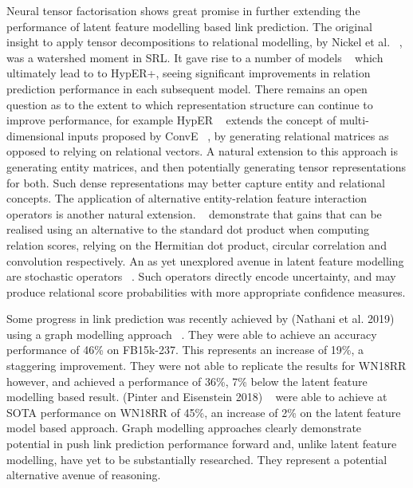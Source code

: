 \noindent Neural tensor factorisation shows great promise in further extending the performance of latent feature modelling based link prediction. The original insight to apply tensor decompositions to relational modelling, by Nickel et al. \unskip~\citep{nickel2011three}, was a watershed moment in SRL. It gave rise to a number of models \unskip~\citep{bordes2011learning, jenatton2012latent, socher2013reasoning, trouillon2016complex, hohenecker2017deep, dettmers2018convolutional, balazevic2019hypernetwork} which ultimately lead to to HypER+, seeing significant improvements in relation prediction performance in each subsequent model. There remains an open question as to the extent to which representation structure can continue to improve performance, for example HypER \unskip~\citep{balazevic2019hypernetwork} extends the concept of multi-dimensional inputs proposed by ConvE \unskip~\citep{dettmers2018convolutional}, by generating relational matrices as opposed to relying on relational vectors. A natural extension to this approach is generating entity matrices, and then potentially generating tensor representations for both. Such dense representations may better capture entity and relational concepts. The application of alternative entity-relation feature interaction operators is another natural extension. \unskip~\citep{trouillon2016complex, nickel2016holographic, dettmers2018convolutional} demonstrate that gains that can be realised using an alternative to the standard dot product when computing relation scores, relying on the Hermitian dot product, circular correlation and convolution respectively. An as yet unexplored avenue in latent feature modelling are stochastic operators \unskip~\citep{kingma2013auto}. Such operators directly encode uncertainty, and may produce relational score probabilities with more appropriate confidence measures. \par

\noindent Some progress in link prediction was recently achieved by (Nathani et al. 2019) using a graph modelling approach ~\citep{nathani2019learning}. They were able to achieve an accuracy performance of 46\% on FB15k-237. This represents an increase of 19\%, a staggering improvement. They were not able to replicate the results for WN18RR however, and achieved a performance of 36\%, 7\% below the latent feature modelling based result. (Pinter and Eisenstein 2018) ~\citep{pinter-eisenstein-2018-predicting} were able to achieve at SOTA performance on WN18RR of 45\%, an increase of 2\% on the latent feature model based approach. Graph modelling approaches clearly demonstrate potential in push link prediction performance forward and, unlike latent feature modelling, have yet to be substantially researched. They represent a potential alternative avenue of reasoning. \par

